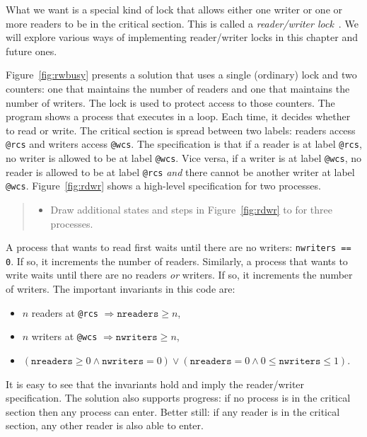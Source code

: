 \documentclass{report}
\begin{document}
What we want is a special kind of lock that allows either one writer
or one or more readers to be in the critical section.  This is called
a \emph{reader/writer lock}~\cite{courtois71}.
We will explore various ways of implementing reader/writer locks in
this chapter and future ones.

Figure~\ref{fig:rwbusy} presents a solution that uses a
single (ordinary) lock and two counters: one that maintains the number
of readers and one that maintains the number of writers.
The lock is used to protect access to those counters.
The program shows a process that executes in a loop.
Each time, it decides whether to read or write.
The critical section is spread between two labels:
readers access \texttt{@rcs} and writers access \texttt{@wcs}.
The specification is that if a reader is at label \texttt{@rcs},
no writer is allowed to be at label \texttt{@wcs}.  Vice versa, if
a writer is at label \texttt{@wcs}, no reader is allowed to be at
label \texttt{@rcs} \emph{and} there cannot be another writer at
label \texttt{@wcs}.  Figure~\ref{fig:rdwr} shows a high-level
specification for two processes.

\begin{quote}
\begin{itemize}
\item Draw additional states and steps in Figure~\ref{fig:rdwr} to 
for three processes.
\end{itemize}
\end{quote}

A process that wants to read first waits until there are no writers:
\texttt{nwriters == 0}.  If so, it increments the number of readers.
Similarly, a
process that wants to write waits until there are no readers \emph{or} writers.
If so, it increments the number of writers.
The important invariants in this code are:
\begin{itemize}
\item $n$ readers at \texttt{@rcs} $\Rightarrow \mathtt{nreaders} \ge n$,
\item $n$ writers at \texttt{@wcs} $\Rightarrow \mathtt{nwriters} \ge n$,
\item $(\mathtt{nreaders} \ge 0 \land \mathtt{nwriters} = 0) \lor
    (\mathtt{nreaders} = 0 \land 0 \le \mathtt{nwriters} \le 1)$.
\end{itemize}
It is easy to see that the invariants hold and imply the reader/writer
specification.
The solution also supports progress: if no process is in the critical
section then any process can enter.  Better still: if any reader is in the
critical section, any other reader is also able to enter.
\end{document}
